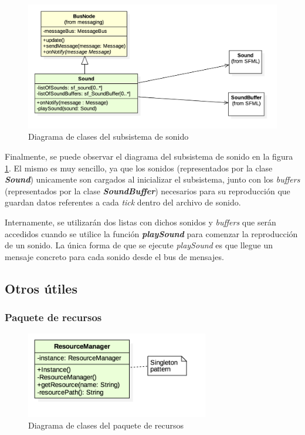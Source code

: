 \begin{figure}
	\centerline{\includegraphics[width=15cm]{otros/UML/png/alld/png/sound__diagramaDeClases_sound_1.png}}
	\caption{Diagrama de clases del subsistema de sonido}
	\label{class:sound}
\end{figure}

Finalmente, se puede observar el diagrama del subsistema de sonido en la figura \ref{class:sound}. El mismo es muy sencillo, ya que los sonidos (representados por la clase \textbf{\textit{Sound}}) unicamente son cargados al inicializar el subsistema, junto con los \textit{buffers} (representados por la clase \textbf{\textit{SoundBuffer}}) necesarios para su reproducción que guardan datos referentes a cada \textit{tick} dentro del archivo de sonido.

\bigskip

Internamente, se utilizarán dos listas con dichos sonidos y \textit{buffers} que serán accedidos cuando se utilice la función \textbf{\textit{playSound}} para comenzar la reproducción de un sonido. La única forma de que se ejecute \textit{playSound} es que llegue un mensaje concreto para cada sonido desde el bus de mensajes.

\subsection{Otros útiles}

\subsubsection*{Paquete de recursos}

\begin{figure}
	\centerline{\includegraphics[width=8cm]{otros/UML/png/alld/png/resources__diagramaDeClases_resources_0.png}}
	\caption{Diagrama de clases del paquete de recursos}
	\label{class:resources}
\end{figure}

